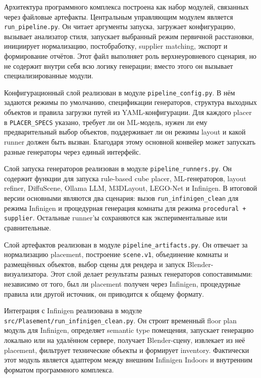 \documentclass[times]{itmo-student-thesis}
\begin{document}
Архитектура программного комплекса построена как набор модулей, связанных через файловые артефакты. Центральным управляющим модулем является \texttt{run\_pipeline.py}. Он читает аргументы запуска, загружает конфигурацию, вызывает анализатор стиля, запускает выбранный режим первичной расстановки, инициирует нормализацию, постобработку, supplier matching, экспорт и формирование отчётов. Этот файл выполняет роль верхнеуровневого сценария, но не содержит внутри себя всю логику генерации; вместо этого он вызывает специализированные модули.

Конфигурационный слой реализован в модуле \texttt{pipeline\_config.py}. В нём задаются режимы по умолчанию, спецификации генераторов, структура выходных объектов и правила загрузки путей из YAML-конфигурации. Для каждого placer в \texttt{PLACER\_SPECS} указано, требует ли он ML-модель, нужен ли ему предварительный выбор объектов, поддерживает ли он режимы layout и какой runner должен быть вызван. Благодаря этому основной конвейер может запускать разные генераторы через единый интерфейс.

Слой запуска генераторов реализован в модуле \texttt{pipeline\_runners.py}. Он содержит функции для запуска rule-based cube placer, ML-генераторов, layout refiner, DiffuScene, Ollama LLM, M3DLayout, LEGO-Net и Infinigen. В итоговой версии основными являются два сценария: вызов \texttt{run\_infinigen\_clean} для режима Infinigen и процедурная генерация комнаты для режима \texttt{procedural + supplier}. Остальные runner'ы сохраняются как экспериментальные или сравнительные.

Слой артефактов реализован в модуле \texttt{pipeline\_artifacts.py}. Он отвечает за нормализацию placement, построение \texttt{scene.v1}, объединение комнаты и размещённых объектов, выбор сцены для рендера и запуск Blender-визуализатора. Этот слой делает результаты разных генераторов сопоставимыми: независимо от того, был ли placement получен через Infinigen, процедурные правила или другой источник, он приводится к общему формату.

Интеграция с Infinigen реализована в модуле \texttt{src/Plasement/run\_infinigen\_clean.py}. Он строит временный floor plan модуль для Infinigen, определяет semantic type помещения, запускает генерацию локально или на удалённом сервере, получает Blender-сцену, извлекает из неё placement, фильтрует технические объекты и формирует inventory. Фактически этот модуль является адаптером между внешним Infinigen Indoors и внутренним форматом программного комплекса.
\end{document}
